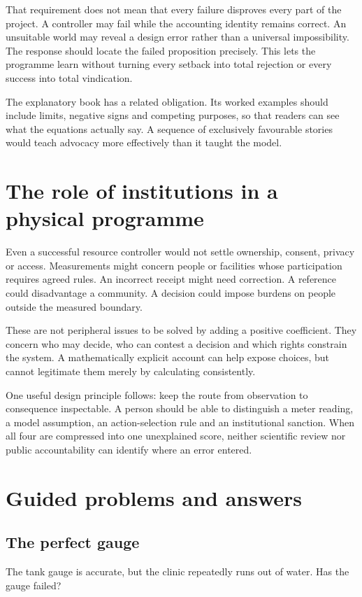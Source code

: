 That requirement does not mean that every failure disproves every part of the project. A controller may fail while the accounting identity remains correct. An unsuitable world may reveal a design error rather than a universal impossibility. The response should locate the failed proposition precisely. This lets the programme learn without turning every setback into total rejection or every success into total vindication.

The explanatory book has a related obligation. Its worked examples should include limits, negative signs and competing purposes, so that readers can see what the equations actually say. A sequence of exclusively favourable stories would teach advocacy more effectively than it taught the model.

\section{The role of institutions in a physical programme}
Even a successful resource controller would not settle ownership, consent, privacy or access. Measurements might concern people or facilities whose participation requires agreed rules. An incorrect receipt might need correction. A reference could disadvantage a community. A decision could impose burdens on people outside the measured boundary.

These are not peripheral issues to be solved by adding a positive coefficient. They concern who may decide, who can contest a decision and which rights constrain the system. A mathematically explicit account can help expose choices, but cannot legitimate them merely by calculating consistently.

One useful design principle follows: keep the route from observation to consequence inspectable. A person should be able to distinguish a meter reading, a model assumption, an action-selection rule and an institutional sanction. When all four are compressed into one unexplained score, neither scientific review nor public accountability can identify where an error entered.

\section{Guided problems and answers}
\subsection{The perfect gauge}
The tank gauge is accurate, but the clinic repeatedly runs out of water. Has the gauge failed?

